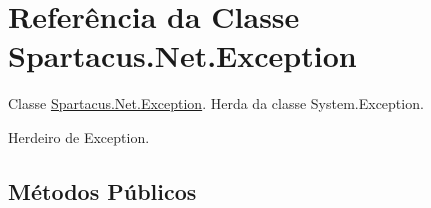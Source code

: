 \hypertarget{classSpartacus_1_1Net_1_1Exception}{\section{Referência da Classe Spartacus.\+Net.\+Exception}
\label{classSpartacus_1_1Net_1_1Exception}
}


Classe \hyperlink{classSpartacus_1_1Net_1_1Exception}{Spartacus.\+Net.\+Exception}. Herda da classe System.\+Exception.  




Herdeiro de Exception.

\subsection*{Métodos Públicos}
